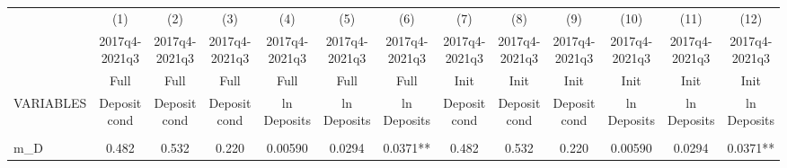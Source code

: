 \documentclass[]{article}
\begin{document}
\begin{center}
\begin{tabular}{lcccccccccccc} \hline
 & (1) & (2) & (3) & (4) & (5) & (6) & (7) & (8) & (9) & (10) & (11) & (12) \\
 & 2017q4-2021q3 & 2017q4-2021q3 & 2017q4-2021q3 & 2017q4-2021q3 & 2017q4-2021q3 & 2017q4-2021q3 & 2017q4-2021q3 & 2017q4-2021q3 & 2017q4-2021q3 & 2017q4-2021q3 & 2017q4-2021q3 & 2017q4-2021q3 \\
 & Full & Full & Full & Full & Full & Full & Init & Init & Init & Init & Init & Init \\
VARIABLES & Deposit cond & Deposit cond & Deposit cond & ln Deposits & ln Deposits & ln Deposits & Deposit cond & Deposit cond & Deposit cond & ln Deposits & ln Deposits & ln Deposits \\ \hline
\vspace{4pt} & \begin{footnotesize}\end{footnotesize} & \begin{footnotesize}\end{footnotesize} & \begin{footnotesize}\end{footnotesize} & \begin{footnotesize}\end{footnotesize} & \begin{footnotesize}\end{footnotesize} & \begin{footnotesize}\end{footnotesize} & \begin{footnotesize}\end{footnotesize} & \begin{footnotesize}\end{footnotesize} & \begin{footnotesize}\end{footnotesize} & \begin{footnotesize}\end{footnotesize} & \begin{footnotesize}\end{footnotesize} & \begin{footnotesize}\end{footnotesize} \\
m\_D & 0.482 & 0.532 & 0.220 & 0.00590 & 0.0294 & 0.0371** & 0.482 & 0.532 & 0.220 & 0.00590 & 0.0294 & 0.0371** \\

\end{tabular}
\end{center}
\end{document}
